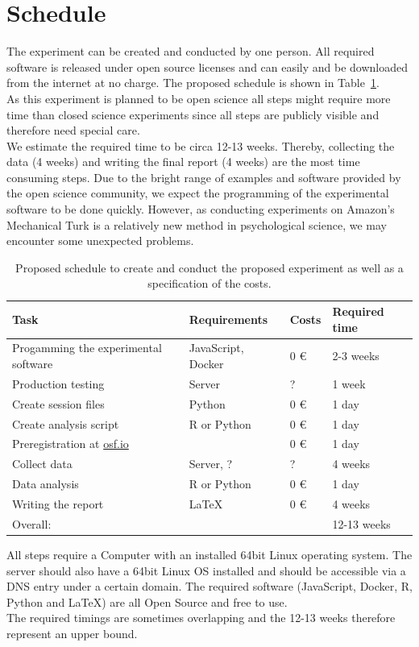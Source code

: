 \documentclass[a4paper, doc, draftall]{apa6}
\begin{document}
\section{Schedule}

The experiment can be created and conducted by one person. All required software is released under open source licenses and can easily and be downloaded from the internet at no charge. The proposed schedule is shown in Table~\ref{schedule}.\\
As this experiment is planned to be open science all steps might require more time than closed science experiments since all steps are publicly visible and therefore need special care.\\
We estimate the required time to be circa 12-13 weeks. Thereby, collecting the data (4 weeks) and writing the final report (4 weeks) are the most time consuming steps. Due to the bright range of examples and software provided by the open science community, we expect the programming of the experimental software to be done quickly. However, as conducting experiments on Amazon's Mechanical Turk is a relatively new method in psychological science, we may encounter some unexpected problems.


\begin{table}[t!]
	\caption{Proposed schedule to create and conduct the proposed experiment as well as a specification of the costs.}
	\label{schedule}
\noindent
	\begin{tabular}{*{4}{l}} 
		\centering
		Task & Requirements & Costs & Required time\\
		\hline
		Progamming the experimental software & JavaScript, Docker & 0 \euro & 2-3 weeks\\
		Production testing & Server & ? & 1 week\\
		Create session files & Python & 0 \euro & 1 day\\
		Create analysis script & R or Python & 0 \euro & 1 day \\
		Preregistration at \url{osf.io} & & 0 \euro & 1 day\\
		Collect data & Server, ? & ? & 4 weeks\\
		Data analysis & R or Python & 0 \euro & 1 day\\
		Writing the report & \LaTeX & 0 \euro & 4 weeks\\		
		\hline
		Overall: & & & 12-13 weeks\\
		
	\end{tabular}
	
	All steps require a Computer with an installed 64bit Linux operating system. The server should also have a 64bit Linux OS installed and should be accessible via a DNS entry under a certain domain. The required software (JavaScript, Docker, R, Python and \LaTeX) are all Open Source and free to use. \\
	The required timings are sometimes overlapping and the 12-13 weeks therefore represent an upper bound.
\end{table}
\end{document}
